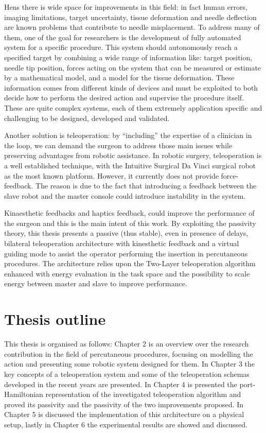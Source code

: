 Hens there is wide space for improvements in this field: in fact human errors, imaging limitations, target uncertainty, tissue deformation and needle deflection are known problems that contribute to needle misplacement.
To address many of them, one of the goal for researchers is the development of fully automated system for a specific procedure. This system should autonomously reach a specified target by combining a wide range of information like: target position, needle tip position, forces acting on the system that can be measured or estimate by a mathematical model, and a model for the tissue deformation.  These information comes from different kinds of devices and must be exploited to both decide how to perform the desired action and supervise the procedure itself.
These are quite complex systems, each of them extremely application specific and challenging to be designed, developed and validated.

Another solution is teleoperation: by ``including'' the expertise of a clinician in the loop, we can demand the surgeon to address those main issues while preserving advantages from robotic assistance.
In robotic surgery, teleoperation is a well established technique, with the Intuitive Surgical Da Vinci surgical robot as the most known platform.
However, it currently does not provide force-feedback. The reason is due to the fact that introducing a feedback between the slave robot and the master console could introduce instability in the system.

Kinaesthetic feedbacks and haptics feedback, could improve the performance of the surgeon and this is the main intent of this work.
By exploiting the passivity theory, this thesis presents a passive (thus stable), even in presence of delays,  bilateral teleoperation architecture with kinesthetic feedback and a virtual guiding mode to assist the operator performing the insertion in percutaneous procedures. 
The architecture relies upon the Two-Layer teleoperation algorithm \cite{Franken2011} enhanced with energy evaluation in the task space and the possibility to scale energy between master and slave to improve performance.

\section{Thesis outline}
This thesis is organised as follows: Chapter 2 is an overview over the research contribution in the field of percutaneous procedures, focusing on modelling the action and presenting some robotic system designed for them. In Chapter 3 the key concepts of a teleoperation system and some of the teleoperation schemas developed in the recent years are presented. In Chapter 4  is presented the port-Hamiltonian representation of the investigated teleoperation algorithm  and proved its passivity and the passivity of the two improvements proposed. In Chapter 5 is discussed the implementation of this architecture on a physical setup, lastly in Chapter 6 the experimental results are showed and discussed.

\clearpage
\thispagestyle{empty}